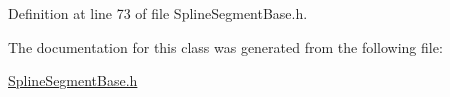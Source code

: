 Definition at line 73 of file Spline\+Segment\+Base.\+h.



The documentation for this class was generated from the following file\+:\begin{DoxyCompactItemize}
\item 
\hyperlink{_spline_segment_base_8h}{Spline\+Segment\+Base.\+h}\end{DoxyCompactItemize}
